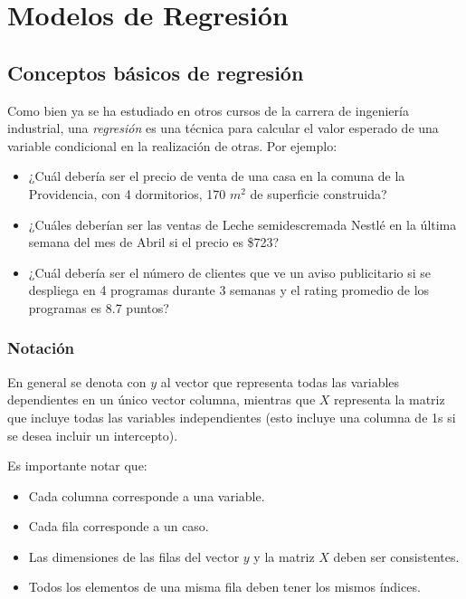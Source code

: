 \documentclass[
]{book}
\providecommand{\tightlist}{%
  \setlength{\itemsep}{0pt}\setlength{\parskip}{0pt}}
\begin{document}
\hypertarget{modelos-de-regresiuxf3n}{%
\chapter{Modelos de Regresión}\label{modelos-de-regresiuxf3n}}

\hypertarget{conceptos-buxe1sicos-de-regresiuxf3n}{%
\section{Conceptos básicos de regresión}\label{conceptos-buxe1sicos-de-regresiuxf3n}}

Como bien ya se ha estudiado en otros cursos de la carrera de ingeniería
industrial, una \emph{regresión} es una técnica para calcular el valor
esperado de una variable condicional en la realización de otras. Por
ejemplo:

\begin{itemize}
\tightlist
\item
  ¿Cuál debería ser el precio de venta de una casa en la comuna de la
  Providencia, con 4 dormitorios, 170 \(m^2\) de superficie construida?
\item
  ¿Cuáles deberían ser las ventas de Leche semidescremada Nestlé en la
  última semana del mes de Abril si el precio es \$723?
\item
  ¿Cuál debería ser el número de clientes que ve un aviso publicitario
  si se despliega en 4 programas durante 3 semanas y el rating
  promedio de los programas es 8.7 puntos?
\end{itemize}

\hypertarget{notaciuxf3n}{%
\subsection{Notación}\label{notaciuxf3n}}

En general se denota con \(y\) al vector que representa todas las
variables dependientes en un único vector columna, mientras que \(X\)
representa la matriz que incluye todas las variables independientes
(esto incluye una columna de 1s si se desea incluir un intercepto).

Es importante notar que:

\begin{itemize}
\tightlist
\item
  Cada columna corresponde a una variable.
\item
  Cada fila corresponde a un caso.
\item
  Las dimensiones de las filas del vector \(y\) y la matriz \(X\) deben
  ser consistentes.
\item
  Todos los elementos de una misma fila deben tener los mismos
  índices.
\end{itemize}
\end{document}
